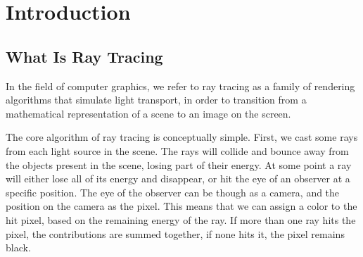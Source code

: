 \documentclass{PoliMi_MasterThesis}
\begin{document}
\mainmatter %


\chapter*{Introduction}
\section*{What Is Ray Tracing}
In the field of computer graphics, we refer to ray tracing as a family of rendering algorithms that simulate light transport, in order to transition from a mathematical representation of a scene to an image on the screen. 

The core algorithm of ray tracing is conceptually simple. First, we cast some rays from each light source in the scene. The rays will collide and bounce away from the objects present in the scene, losing part of their energy. At some point a ray will either lose all of its energy and disappear, or hit the eye of an observer at a specific position. The eye of the observer can be though as a camera, and the position on the camera as the pixel. This means that we can assign a color to the hit pixel, based on the remaining energy of the ray. If more than one ray hits the pixel, the contributions are summed together, if none hits it, the pixel remains black.
\end{document}
